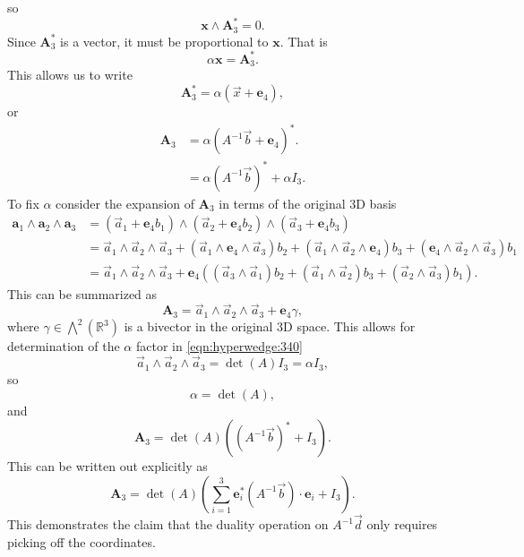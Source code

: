 \documentclass[letterpaper]{scrreprt}
\newcommand{\lr}[1]{\left(#1\right)}
\newcommand{\Ba}[0]{\mathbf{a}}
\newcommand{\Be}[0]{\mathbf{e}}
\newcommand{\Bx}[0]{\mathbf{x}}
\newcommand{\BA}[0]{\mathbf{A}}
\newcommand{\bbR}[0]{\mathbb{R}}
\newcommand{\conj}[0]{{*}}
\begin{document}
so
\begin{equation}\label{eqn:hyperwedge:280}
\Bx \wedge \BA_3^\conj = 0.
\end{equation}
Since \( \BA_3^\conj \) is a vector, it must be proportional to \( \Bx \).  That is
\begin{equation}\label{eqn:hyperwedge:300}
\alpha \Bx = \BA_3^\conj.
\end{equation}
This allows us to write
\begin{equation}\label{eqn:hyperwedge:320}
\BA_3^\conj = \alpha \lr{ \vec{x} + \Be_4 },
\end{equation}
or
\begin{equation}\label{eqn:hyperwedge:340}
\begin{aligned}
\BA_3
&= \alpha \lr{ A^{-1} \vec{b} + \Be_4 }^\conj. \\
&= \alpha \lr{ A^{-1} \vec{b} }^\conj + \alpha I_3.
\end{aligned}
\end{equation}
To fix \( \alpha \) consider the expansion of \( \BA_3 \) in terms of the original 3D basis
\begin{equation}\label{eqn:hyperwedge:360}
\begin{aligned}
\Ba_1 \wedge \Ba_2 \wedge \Ba_3
&=
\lr{ \vec{a}_1 + \Be_4 b_1 }
\wedge
\lr{ \vec{a}_2 + \Be_4 b_2 }
\wedge
\lr{ \vec{a}_3 + \Be_4 b_3 } \\
&=
\vec{a}_1
\wedge
\vec{a}_2
\wedge
\vec{a}_3
+
\lr{
\vec{a}_1 \wedge \Be_4 \wedge \vec{a}_3
} b_2
+
\lr{
\vec{a}_1 \wedge \vec{a}_2 \wedge \Be_4
} b_3
+
\lr{
\Be_4 \wedge \vec{a}_2 \wedge \vec{a}_3
} b_1 \\
&=
\vec{a}_1
\wedge
\vec{a}_2
\wedge
\vec{a}_3
+
\Be_4 \lr{
   \lr{
   \vec{a}_3 \wedge \vec{a}_1
   } b_2
   +
   \lr{
   \vec{a}_1 \wedge \vec{a}_2
   } b_3
   +
   \lr{
   \vec{a}_2 \wedge \vec{a}_3
   } b_1
}.
\end{aligned}
\end{equation}
This can be summarized as
\begin{equation}\label{eqn:hyperwedge:380}
\BA_3 =
\vec{a}_1 \wedge \vec{a}_2 \wedge \vec{a}_3
+ \Be_4 \gamma,
\end{equation}
where \( \gamma \in \bigwedge^2(\bbR^3) \) is a bivector in the original 3D space.  This allows for determination of the \( \alpha \) factor in \cref{eqn:hyperwedge:340}
\begin{equation}\label{eqn:hyperwedge:400}
\vec{a}_1 \wedge \vec{a}_2 \wedge \vec{a}_3
= \det\lr{A} I_3 = \alpha I_3,
\end{equation}
so
\begin{equation}\label{eqn:hyperwedge:420}
\alpha = \det\lr{A},
\end{equation}
and
\begin{equation}\label{eqn:hyperwedge:440}
\BA_3
=
\det\lr{A} \lr{
   \lr{A^{-1} \vec{b}}^\conj + I_3
}.
\end{equation}
This can be written out explicitly as
\begin{equation}\label{eqn:hyperwedge:460}
\BA_3
=
\det\lr{A} \lr{
   \sum_{i = 1}^3
\Be_i^\conj
\lr{A^{-1} \vec{b}} \cdot \Be_i
+ I_3
}.
\end{equation}
This demonstrates the claim that the duality operation on \( A^{-1} \vec{d} \) only requires picking off the coordinates.
\end{document}
